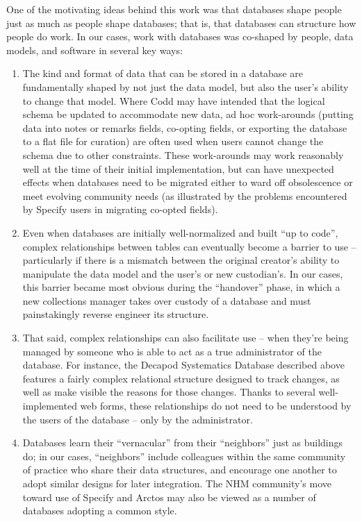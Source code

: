 One of the motivating ideas behind this work was that databases shape people just as much as people shape databases; that is, that databases can structure how people do work. In our cases, work with databases was co-shaped by people, data models, and software in several key ways: 
\begin{enumerate}
\item The kind and format of data that can be stored in a database are fundamentally shaped by not just the data model, but also the user’s ability to change that model. Where Codd may have intended that the logical schema be updated to accommodate new data, ad hoc work-arounds (putting data into notes or remarks fields, co-opting fields, or exporting the database to a flat file for curation) are often used when users cannot change the schema due to other constraints. These work-arounds may work reasonably well at the time of their initial implementation, but can have unexpected effects when databases need to be migrated either to ward off obsolescence or meet evolving community needs (as illustrated by the problems encountered by Specify users in migrating co-opted fields). 
\item Even when databases are initially well-normalized and built “up to code”, complex relationships between tables can eventually become a barrier to use – particularly if there is a mismatch between the original creator’s ability to manipulate the data model and the user’s or new custodian’s. In our cases, this barrier became most obvious during the “handover” phase, in which a new collections manager takes over custody of a database and must painstakingly reverse engineer its structure. 
\item That said, complex relationships can also facilitate use -- when they’re being managed by someone who is able to act as a true administrator of the database. For instance, the Decapod Systematics Database described above features a fairly complex relational structure designed to track changes, as well as make visible the reasons for those changes. Thanks to several well-implemented web forms, these relationships do not need to be understood by the users of the database – only by the administrator.
\item Databases learn their “vernacular” from their “neighbors” just as buildings do; in our cases, “neighbors” include colleagues within the same community of practice who share their data structures, and encourage one another to adopt similar designs for later integration. The NHM community’s move toward use of Specify and Arctos may also be viewed as a number of databases adopting a common style. 
\end{enumerate}


